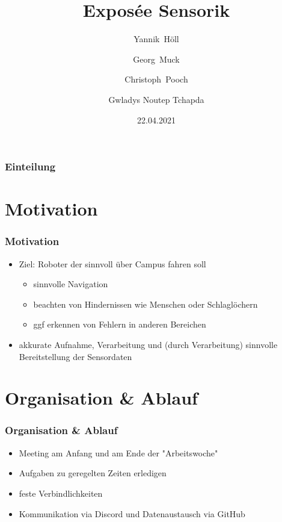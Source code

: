\documentclass{beamer}
\title{Exposée Sensorik}
\author[Y. Höll, G. Muck, C. Pooch, G. N. Tchapda]
	{Yannik~Höll \\ \and Georg~Muck \\ \and Christoph~Pooch \\ \and  Gwladys Noutep Tchapda}
\date{22.04.2021}
\begin{document}
	\frame{\titlepage}


\begin{frame}
\frametitle{Einteilung}
\tableofcontents
\end{frame}

\section{Motivation}
\begin{frame}
\frametitle{Motivation}
\begin{itemize}
\item<1-> Ziel: Roboter der sinnvoll über Campus fahren soll
\begin{itemize}
\item<2-4> sinnvolle Navigation
\item<3-4> beachten von Hindernissen wie Menschen oder Schlaglöchern
\item<4> ggf erkennen von Fehlern in anderen Bereichen
\end{itemize}

\item<5-> akkurate \alert<6->{Aufnahme}, \alert<6->{Verarbeitung} und (durch \alert<6->{Verarbeitung}) sinnvolle \alert<6->{Bereitstellung} der Sensordaten
\end{itemize}
\end{frame}


\section{Organisation \& Ablauf}
\begin{frame}
\frametitle{Organisation \& Ablauf}
\begin{itemize}
\item<1-> \alert{Meeting} am Anfang und am Ende der "Arbeitswoche"
\item<2-> Aufgaben zu geregelten Zeiten erledigen
\item<3-> feste \alert{Verbindlichkeiten}
\item<4-> Kommunikation via \alert{Discord} und Datenaustausch via \alert{GitHub}
\end{itemize}
\end{frame}
\end{document}
